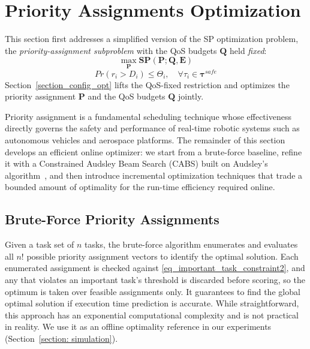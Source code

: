 	\section{Priority Assignments Optimization}
    \label{section_priority_opt}

    This section first addresses a simplified version of the SP optimization problem, the \emph{priority-assignment subproblem} with the QoS budgets $\boldsymbol{Q}$ held \emph{fixed}:
    \begin{equation}
        \max_{\boldsymbol{P}} \textbf{SP}(\boldsymbol{P};\boldsymbol{Q}, \textbf{E})
        \label{eq_pa_subproblem}
    \end{equation}
	\begin{equation}
		Pr(r_i > D_i) \leq \Theta_i, \quad \forall \tau_i \in \boldsymbol{\tau}^{safe}
		\label{eq_important_task_constraint2}
	\end{equation}
    Section~\ref{section_config_opt} lifts the QoS-fixed restriction and optimizes the priority assignment $\boldsymbol{P}$ and the QoS budgets $\boldsymbol{Q}$ jointly.

    Priority assignment is a fundamental scheduling technique whose effectiveness directly governs the safety and performance of real-time robotic systems such as autonomous vehicles and aerospace platforms.
    The remainder of this section develops an efficient online optimizer: we start from a brute-force baseline, refine it with a Constrained Audsley Beam Search (CABS) built on Audsley's algorithm~\cite{Audsley91optimalpriority}, and then introduce incremental optimization techniques that trade a bounded amount of optimality for the run-time efficiency required online.


	\subsection{Brute-Force Priority Assignments}
	\label{section_bf_pa}
    Given a task set of $n$ tasks, the brute-force algorithm enumerates and evaluates all $n!$ possible priority assignment vectors to identify the optimal solution.
    Each enumerated assignment is checked against \eqref{eq_important_task_constraint2}, and any that violates an important task's threshold is discarded before scoring, 
    so the optimum is taken over feasible assignments only. 
    It guarantees to find the global optimal solution if execution time prediction is accurate.
    While straightforward, this approach has an exponential computational complexity and is not practical in reality.
    We use it as an offline optimality reference in our experiments (Section~\ref{section: simulation}).

